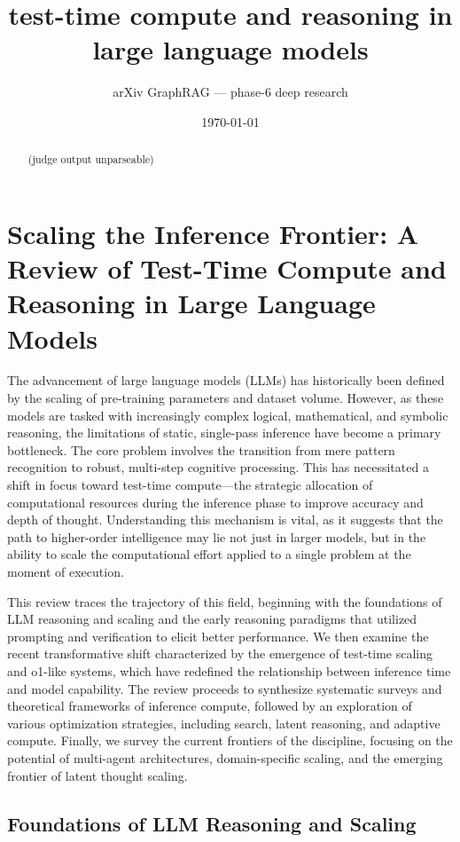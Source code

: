 \documentclass[11pt]{article}
\title{test-time compute and reasoning in large language models}
\author{arXiv GraphRAG --- phase-6 deep research}
\date{\today}
\begin{document}
\maketitle

\begin{abstract}
(judge output unparseable)
\end{abstract}

\section{Scaling the Inference Frontier: A Review of Test-Time Compute and Reasoning in Large Language Models}

The advancement of large language models (LLMs) has historically been defined by the scaling of pre-training parameters and dataset volume. However, as these models are tasked with increasingly complex logical, mathematical, and symbolic reasoning, the limitations of static, single-pass inference have become a primary bottleneck. The core problem involves the transition from mere pattern recognition to robust, multi-step cognitive processing. This has necessitated a shift in focus toward test-time compute—the strategic allocation of computational resources during the inference phase to improve accuracy and depth of thought. Understanding this mechanism is vital, as it suggests that the path to higher-order intelligence may lie not just in larger models, but in the ability to scale the computational effort applied to a single problem at the moment of execution.

This review traces the trajectory of this field, beginning with the foundations of LLM reasoning and scaling and the early reasoning paradigms that utilized prompting and verification to elicit better performance. We then examine the recent transformative shift characterized by the emergence of test-time scaling and o1-like systems, which have redefined the relationship between inference time and model capability. The review proceeds to synthesize systematic surveys and theoretical frameworks of inference compute, followed by an exploration of various optimization strategies, including search, latent reasoning, and adaptive compute. Finally, we survey the current frontiers of the discipline, focusing on the potential of multi-agent architectures, domain-specific scaling, and the emerging frontier of latent thought scaling.

\subsection{Foundations of LLM Reasoning and Scaling}
\end{document}
